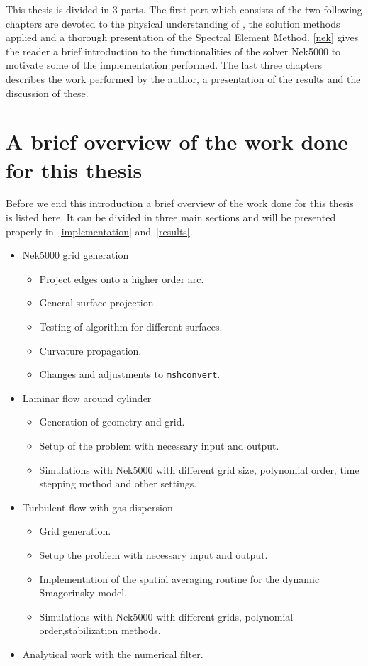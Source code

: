 This thesis is divided in 3 parts. The first part which consists of the two following chapters are devoted to the physical understanding 
of , the solution methods applied and a thorough presentation of the Spectral Element Method. \cref{nek} gives the reader a brief 
introduction to the functionalities of the solver Nek5000 to motivate some of the implementation performed. The last three chapters 
describes the work performed by the author, a presentation of the results and the discussion of these.

\section{A brief overview of the work done for this thesis}

Before we end this introduction a brief overview of the work done for this thesis is listed here. 
It can be divided in three main sections and will be presented properly in~\cref{implementation}
and~\ref{results}. 

\begin{itemize}
    \item Nek5000 grid generation
        \begin{itemize}
            \item Project edges onto a higher order arc.
            \item General surface projection.
            \item Testing of algorithm for different surfaces.
            \item Curvature propagation.
            \item Changes and adjustments to \verb|mshconvert|.
        \end{itemize}
    \item Laminar flow around cylinder
        \begin{itemize}
            \item Generation of geometry and grid.
            \item Setup of the problem with necessary input and output.
            \item Simulations with Nek5000 with different grid size, polynomial order, time stepping method and other settings.
        \end{itemize}
    \item Turbulent flow with gas dispersion
        \begin{itemize}
            \item Grid generation.
            \item Setup the problem with necessary input and output.
            \item Implementation of the spatial averaging routine for the dynamic Smagorinsky model.
            \item Simulations with Nek5000 with different grids, polynomial order,stabilization methods.
        \end{itemize}
    \item Analytical work with the numerical filter.
\end{itemize}

